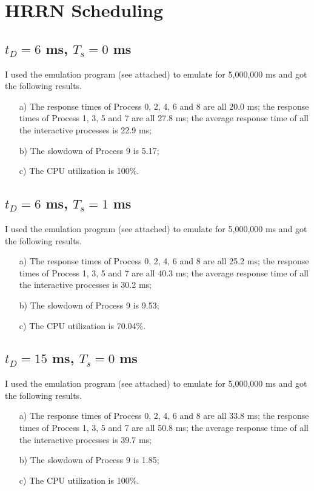 \documentclass[12pt,letterpaper]{article}
\begin{document}
\section{HRRN Scheduling}
\subsection{$t_D=6$ ms, $T_s = 0$ ms}
I used the emulation program (see attached) to emulate for 5,000,000 ms and got the following results.
\begin{enumerate}
\item[a)] The response times of Process 0, 2, 4, 6 and 8 are all 20.0 ms; the response times of Process 1, 3, 5 and 7 are all 27.8 ms; the average response time of all the interactive processes is 22.9 ms;
\item[b)] The slowdown of Process 9 is 5.17;
\item[c)] The CPU utilization is 100\%.
\end{enumerate}

\subsection{$t_D=6$ ms, $T_s = 1$ ms}
I used the emulation program (see attached) to emulate for 5,000,000 ms and got the following results.
\begin{enumerate}
\item[a)] The response times of Process 0, 2, 4, 6 and 8 are all 25.2 ms; the response times of Process 1, 3, 5 and 7 are all 40.3 ms; the average response time of all the interactive processes is 30.2 ms;
\item[b)] The slowdown of Process 9 is 9.53;
\item[c)] The CPU utilization is 70.04\%.
\end{enumerate}

\subsection{$t_D=15$ ms, $T_s = 0$ ms}
I used the emulation program (see attached) to emulate for 5,000,000 ms and got the following results.
\begin{enumerate}
\item[a)] The response times of Process 0, 2, 4, 6 and 8 are all 33.8 ms; the response times of Process 1, 3, 5 and 7 are all 50.8 ms; the average response time of all the interactive processes is 39.7 ms;
\item[b)] The slowdown of Process 9 is 1.85;
\item[c)] The CPU utilization is 100\%.
\end{enumerate}
\end{document}
